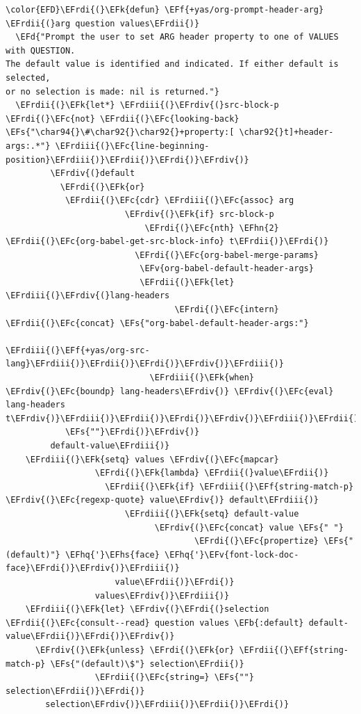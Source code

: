 \documentclass{scrartcl}
\newcommand{\EFk}[1]{\textcolor{EFk}{#1}} %
\newcommand{\EFd}[1]{\textcolor{EFd}{#1}} %
\newcommand{\EFs}[1]{\textcolor{EFs}{#1}} %
\newcommand{\EFb}[1]{\textcolor{EFb}{#1}} %
\newcommand{\EFc}[1]{\textcolor{EFc}{#1}} %
\newcommand{\EFv}[1]{\textcolor{EFv}{#1}} %
\newcommand{\EFf}[1]{\textcolor{EFf}{#1}} %
\newcommand{\EFhn}[1]{#1} %
\newcommand{\EFhq}[1]{#1} %
\newcommand{\EFhs}[1]{#1} %
\newcommand{\EFrdi}[1]{#1} %
\newcommand{\EFrdii}[1]{#1} %
\newcommand{\EFrdiii}[1]{#1} %
\newcommand{\EFrdiv}[1]{#1} %
\begin{document}
\begin{Code}
\begin{Verbatim}[]
\color{EFD}\EFrdi{(}\EFk{defun} \EFf{+yas/org-prompt-header-arg} \EFrdii{(}arg question values\EFrdii{)}
  \EFd{"Prompt the user to set ARG header property to one of VALUES with QUESTION.
The default value is identified and indicated. If either default is selected,
or no selection is made: nil is returned."}
  \EFrdii{(}\EFk{let*} \EFrdiii{(}\EFrdiv{(}src-block-p \EFrdi{(}\EFc{not} \EFrdii{(}\EFc{looking-back} \EFs{"\char94{}\#\char92{}\char92{}+property:[ \char92{}t]+header-args:.*"} \EFrdiii{(}\EFc{line-beginning-position}\EFrdiii{)}\EFrdii{)}\EFrdi{)}\EFrdiv{)}
         \EFrdiv{(}default
           \EFrdi{(}\EFk{or}
            \EFrdii{(}\EFc{cdr} \EFrdiii{(}\EFc{assoc} arg
                        \EFrdiv{(}\EFk{if} src-block-p
                            \EFrdi{(}\EFc{nth} \EFhn{2} \EFrdii{(}\EFc{org-babel-get-src-block-info} t\EFrdii{)}\EFrdi{)}
                          \EFrdi{(}\EFc{org-babel-merge-params}
                           \EFv{org-babel-default-header-args}
                           \EFrdii{(}\EFk{let} \EFrdiii{(}\EFrdiv{(}lang-headers
                                  \EFrdi{(}\EFc{intern} \EFrdii{(}\EFc{concat} \EFs{"org-babel-default-header-args:"}
                                                  \EFrdiii{(}\EFf{+yas/org-src-lang}\EFrdiii{)}\EFrdii{)}\EFrdi{)}\EFrdiv{)}\EFrdiii{)}
                             \EFrdiii{(}\EFk{when} \EFrdiv{(}\EFc{boundp} lang-headers\EFrdiv{)} \EFrdiv{(}\EFc{eval} lang-headers t\EFrdiv{)}\EFrdiii{)}\EFrdii{)}\EFrdi{)}\EFrdiv{)}\EFrdiii{)}\EFrdii{)}
            \EFs{""}\EFrdi{)}\EFrdiv{)}
         default-value\EFrdiii{)}
    \EFrdiii{(}\EFk{setq} values \EFrdiv{(}\EFc{mapcar}
                  \EFrdi{(}\EFk{lambda} \EFrdii{(}value\EFrdii{)}
                    \EFrdii{(}\EFk{if} \EFrdiii{(}\EFf{string-match-p} \EFrdiv{(}\EFc{regexp-quote} value\EFrdiv{)} default\EFrdiii{)}
                        \EFrdiii{(}\EFk{setq} default-value
                              \EFrdiv{(}\EFc{concat} value \EFs{" "}
                                      \EFrdi{(}\EFc{propertize} \EFs{"(default)"} \EFhq{'}\EFhs{face} \EFhq{'}\EFv{font-lock-doc-face}\EFrdi{)}\EFrdiv{)}\EFrdiii{)}
                      value\EFrdii{)}\EFrdi{)}
                  values\EFrdiv{)}\EFrdiii{)}
    \EFrdiii{(}\EFk{let} \EFrdiv{(}\EFrdi{(}selection \EFrdii{(}\EFc{consult--read} question values \EFb{:default} default-value\EFrdii{)}\EFrdi{)}\EFrdiv{)}
      \EFrdiv{(}\EFk{unless} \EFrdi{(}\EFk{or} \EFrdii{(}\EFf{string-match-p} \EFs{"(default)\$"} selection\EFrdii{)}
                  \EFrdii{(}\EFc{string=} \EFs{""} selection\EFrdii{)}\EFrdi{)}
        selection\EFrdiv{)}\EFrdiii{)}\EFrdii{)}\EFrdi{)}
\end{Verbatim}
\end{Code}
\end{document}
